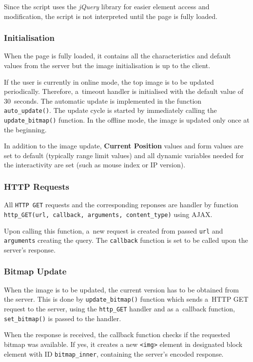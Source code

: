 Since the script uses the \textit{jQuery} library for easier element
access and modification, the script is not interpreted until the page is
fully loaded.

\subsubsection{Initialisation}
When the page is fully loaded, it contains all the characteristics
and default values from the server but the image initialisation is
up to the client.

If the user is currently in online mode, the top image is to be updated
periodically. Therefore, a~timeout handler is initialised with the
default value of 30\ seconds. The automatic update is implemented
in the function \texttt{auto\_update()}. The update cycle is started by
immediately calling the \texttt{update\_bitmap()} function. In the offline
mode, the image is updated only once at the beginning.

In addition to the image update, \textbf{Current Position} values and
form values are set to default (typically range limit values)
and all dynamic variables needed for the interactivity are set
(such as mouse index or IP version).

\subsubsection{HTTP Requests}
All \texttt{HTTP GET} requests and the corresponding reponses are handler by
function \texttt{http\_GET(\-url, callback, arguments, content\_type)} using
AJAX.

Upon calling this function, a~new request is created from passed \texttt{url} and
\texttt{arguments} creating the query. The \texttt{callback} function is set to
be called upon the server's response.


\subsubsection{Bitmap Update}
When the image is to be updated, the current version has to be obtained
from the server. This is done by \texttt{update\_bitmap()} function which
sends a~HTTP GET request to the server, using the \texttt{http\_GET} handler
and as a~callback function, \texttt{set\_bitmap()} is passed to the handler.

When the response is received, the callback function checks if the requested
bitmap was available. If yes, it creates a new \texttt{<img>} element in
designated block element with ID \texttt{bitmap\_inner}, containing the
server's encoded response.

